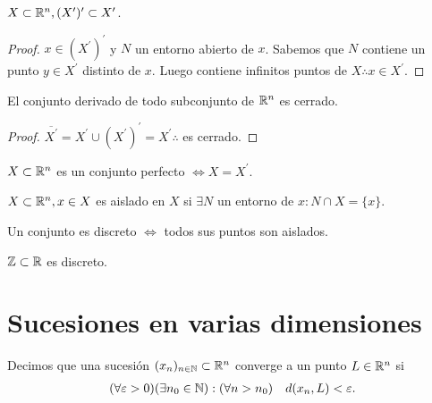 \begin{prop}
  \(X \subset \mathbb{R}^n, (X^{\prime})^{\prime} \subset X^{\prime}\).
  \begin{proof}
    \(x \in (X^{\prime})^{\prime}\) y \(N\) un entorno abierto de \(x\). Sabemos que \(N\) contiene un punto \(y \in X^{\prime}\) distinto de \(x\). Luego contiene infinitos puntos de \(X \therefore x \in X^{\prime}\).
  \end{proof}
\end{prop}

\begin{corollary}
  El conjunto derivado de todo subconjunto de \(\mathbb{R}^n\) es cerrado.
  \begin{proof}
    \(\overline{X^{\prime}} = X^{\prime} \cup (X^{\prime})^{\prime} = X^{\prime} \therefore\) es cerrado.
  \end{proof}
\end{corollary}

\begin{definition}
  \(X \subset \mathbb{R}^n\) es un conjunto perfecto \(\iff X = X^{\prime}\).
\end{definition}

\begin{definition}
  \(X \subset \mathbb{R}^n, x \in X\) es aislado en \(X\) si \(\exists N\) un entorno de \(x : N \cap X = \{x\}\).
\end{definition}

\begin{definition}
  Un conjunto es discreto \(\iff\) todos sus puntos son aislados.
\end{definition}

\begin{eg}
  \(\mathbb{Z} \subset \mathbb{R}\) es discreto.
\end{eg}

\section{Sucesiones en varias dimensiones}

Decimos que una sucesión \((x_n)_{n \in \mathbb{N}} \subset \mathbb{R}^n\) converge a un punto \(L \in \mathbb{R}^n\) si \begin{align*}
  (\forall \varepsilon > 0)(\exists n_0 \in \mathbb{N}) : (\forall n > n_0) \quad d(x_n, L) < \varepsilon.
\end{align*}

